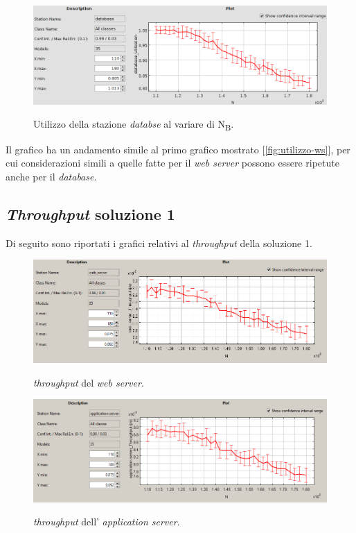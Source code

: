 \documentclass[../main.tex]{subfiles}
\begin{document}
    \begin{figure}[H]
        \centering
        \includegraphics[scale = 0.45]{assets/db_ut_1.png}\\
        \caption[\textit{Utilizzo} della stazione \textit{database}]{Utilizzo della stazione\textit{
            databse} al variare di N\textsubscript{B}.}
        \label{fig:utilizzo-db}
    \end{figure}
    Il grafico ha un andamento simile al primo grafico mostrato [\ref{fig:utilizzo-ws}], per cui
    considerazioni simili a quelle fatte per il \textit{web server} possono essere ripetute anche per il \textit{database}.

    \subsection{\textit{Throughput} soluzione 1}\label{subsec:throughput-soluzione-1}
    Di seguito sono riportati i grafici relativi al \textit{throughput} della soluzione 1.
    \begin{figure}[H]
        \centering
        \includegraphics[scale = 0.6]{assets/ws_th_1.PNG}\\
        \caption[\textit{Throughput} del \textit{web server}]{\textit{throughput} del \textit{web server}.}
        \label{fig:throughput-time-ws}
    \end{figure}

    \begin{figure}[H]
        \centering
        \includegraphics[scale = 0.6]{assets/as_th_1.PNG}\\
        \caption[\textit{Throughput} dell' \textit{application server}]{\textit{throughput} dell' \textit{application server}.}
        \label{fig:throughput-time-as}
    \end{figure}
\end{document}
